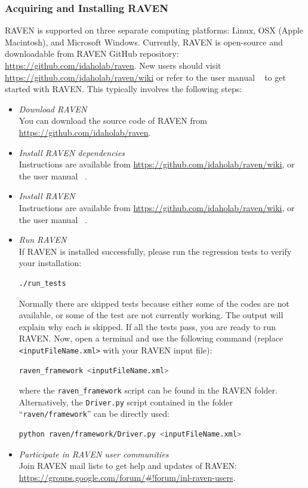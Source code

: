 \subsubsection{Acquiring and Installing RAVEN}
RAVEN is supported on three separate computing platforms: Linux, OSX (Apple Macintosh), and Microsoft Windows.
Currently, RAVEN is open-source and downloadable from RAVEN GitHub repository: \url{https://github.com/idaholab/raven}.
New users should visit \url{https://github.com/idaholab/raven/wiki} or refer to the user manual ~\cite{RAVENuserManual}
to get started with RAVEN. This typically involves the following steps:
\begin{itemize}
  \item \textit{Download RAVEN}
    \\ You can download the source code of RAVEN from \url{https://github.com/idaholab/raven}.
  \item \textit{Install RAVEN dependencies}
    \\ Instructions are available from \url{https://github.com/idaholab/raven/wiki}, or the user manual ~\cite{RAVENuserManual}.
  \item \textit{Install RAVEN}
    \\ Instructions are available from \url{https://github.com/idaholab/raven/wiki}, or the user manual ~\cite{RAVENuserManual}.
  \item \textit{Run RAVEN}
    \\ If RAVEN is installed successfully, please run the regression tests to verify your installation:
    \begin{lstlisting}[language=bash]
      ./run_tests
    \end{lstlisting}
    Normally there are skipped tests because either some of the codes are not available, or some of the test are not
    currently working. The output will explain why each is skipped. If all the tests pass, you are ready to run RAVEN.
    Now, open a terminal and use the following command (replace \texttt{<inputFileName.xml>} with your
    RAVEN input file):
    \begin{lstlisting}[language=bash]
      raven_framework <inputFileName.xml>
    \end{lstlisting}
    where the \texttt{raven\_framework} script can be found in the RAVEN folder. Alternatively, the \texttt{Driver.py} script
    contained in the folder ``\texttt{raven/framework}'' can be directly used:
    \begin{lstlisting}[language=bash]
      python raven/framework/Driver.py <inputFileName.xml>
    \end{lstlisting}
  \item \textit{Participate in RAVEN user communities}
    \\ Join RAVEN mail lists to get help and updates of RAVEN: \url{https://groups.google.com/forum/#!forum/inl-raven-users}.
\end{itemize}



\pagebreak


